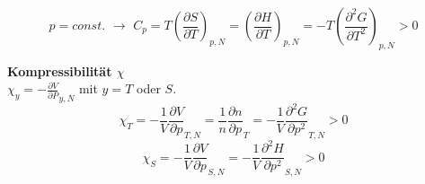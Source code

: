 \documentclass[a4paper,11pt]{scrartcl}
\begin{document}
\begin{equation}
 p= const. \,\, \rightarrow \,\, C_p = T \left( \frac{\partial S}{\partial T }\right)_{p,N} = \left( \frac{\partial H}{\partial T }\right)_{p,N} = - T \left( \frac{\partial^2 G}{\partial T^2} \right)_{p,N} > 0
\end{equation}

\textbf{Kompressibilität $\chi$}\\
$\chi_y = - \frac{\partial V}{\partial P}_{y,N} $ mit $y = T$ oder $S$.
$$\chi_T = - \frac{1}{V} \frac{\partial V}{\partial p}_{T,N} = \frac{1}{n} \frac{\partial n}{\partial p}_{T} = - \frac{1}{V} \frac{\partial^2 G}{\partial p^2}_{T,N} > 0$$
\begin{equation}
 \chi_S = - \frac{1}{V} \frac{\partial V}{\partial p}_{S,N} = - \frac{1}{V} \frac{\partial^2 H}{\partial p^2}_{S,N} > 0
\end{equation}
\end{document}
